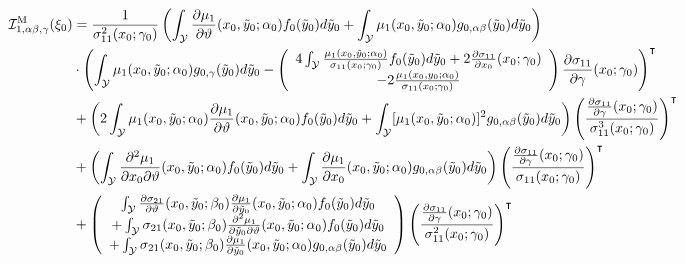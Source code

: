 \documentclass[11pt]{article}%
\theoremstyle{definition}
\begin{document}
\begin{align}
\mathcal{I}_{1,\alpha\beta,\gamma}^{\text{M}}(\xi_{0}) &  =\frac{1}%
{\sigma_{11}^{2}(x_{0};\gamma_{0})}\left(  \int_{\mathcal{Y}}\frac{\partial
\mu_{1}}{\partial\vartheta}(x_{0},\tilde{y}_{0};\alpha_{0})f_{0}(\tilde{y}%
_{0})d\tilde{y}_{0}+\int_{\mathcal{Y}}\mu_{1}(x_{0},\tilde{y}_{0};\alpha
_{0})g_{0,\alpha\beta}(\tilde{y}_{0})d\tilde{y}_{0}\right)
\label{I_M_1 ab c SD}\\
&  \cdot\left(  \int_{\mathcal{Y}}\mu_{1}(x_{0},\tilde{y}_{0};\alpha
_{0})g_{0,\gamma}(\tilde{y}_{0})d\tilde{y}_{0}-\left(
\begin{array}
[c]{c}%
4\int_{\mathcal{Y}}\frac{\mu_{1}(x_{0},\tilde{y}_{0};\alpha_{0})}{\sigma
_{11}(x_{0};\gamma_{0})}f_{0}(\tilde{y}_{0})d\tilde{y}_{0}+2\frac
{\partial\sigma_{11}}{\partial x_{0}}(x_{0};\gamma_{0})\\
-2\frac{\mu_{1}(x_{0},y_{0};\alpha_{0})}{\sigma_{11}(x_{0};\gamma_{0})}%
\end{array}
\right)  \frac{\partial\sigma_{11}}{\partial\gamma}(x_{0};\gamma_{0})\right)
^{\intercal}\nonumber\\
&  +\left(  2\int_{\mathcal{Y}}\mu_{1}(x_{0},\tilde{y}_{0};\alpha_{0}%
)\frac{\partial\mu_{1}}{\partial\vartheta}(x_{0},\tilde{y}_{0};\alpha
_{0})f_{0}(\tilde{y}_{0})d\tilde{y}_{0}+\int_{\mathcal{Y}}[\mu_{1}%
(x_{0},\tilde{y}_{0};\alpha_{0})]^{2}g_{0,\alpha\beta}(\tilde{y}_{0}%
)d\tilde{y}_{0}\right)  \left(  \frac{\frac{\partial\sigma_{11}}%
{\partial\gamma}(x_{0};\gamma_{0})}{\sigma_{11}^{3}(x_{0};\gamma_{0})}\right)
^{\intercal}\nonumber\\
&  +\left(  \int_{\mathcal{Y}}\frac{\partial^{2}\mu_{1}}{\partial
x_{0}\partial\vartheta}(x_{0},\tilde{y}_{0};\alpha_{0})f_{0}(\tilde{y}%
_{0})d\tilde{y}_{0}+\int_{\mathcal{Y}}\frac{\partial\mu_{1}}{\partial x_{0}%
}(x_{0},\tilde{y}_{0};\alpha_{0})g_{0,\alpha\beta}(\tilde{y}_{0})d\tilde
{y}_{0}\right)  \left(  \frac{\frac{\partial\sigma_{11}}{\partial\gamma}%
(x_{0};\gamma_{0})}{\sigma_{11}(x_{0};\gamma_{0})}\right)  ^{\intercal}\\
&  +\left(
\begin{array}
[c]{c}%
\int_{\mathcal{Y}}\frac{\partial\sigma_{21}}{\partial\vartheta}(x_{0}%
,\tilde{y}_{0};\beta_{0})\frac{\partial\mu_{1}}{\partial\tilde{y}_{0}}%
(x_{0},\tilde{y}_{0};\alpha_{0})f_{0}(\tilde{y}_{0})d\tilde{y}_{0}\\
+\int_{\mathcal{Y}}\sigma_{21}(x_{0},\tilde{y}_{0};\beta_{0})\frac
{\partial^{2}\mu_{1}}{\partial\tilde{y}_{0}\partial\vartheta}(x_{0},\tilde
{y}_{0};\alpha_{0})f_{0}(\tilde{y}_{0})d\tilde{y}_{0}\\
+\int_{\mathcal{Y}}\sigma_{21}(x_{0},\tilde{y}_{0};\beta_{0})\frac{\partial
\mu_{1}}{\partial\tilde{y}_{0}}(x_{0},\tilde{y}_{0};\alpha_{0})g_{0,\alpha
\beta}(\tilde{y}_{0})d\tilde{y}_{0}%
\end{array}
\right)  \left(  \frac{\frac{\partial\sigma_{11}}{\partial\gamma}(x_{0}%
;\gamma_{0})}{\sigma_{11}^{2}(x_{0};\gamma_{0})}\right)  ^{\intercal}\nonumber
\end{align}
\end{document}
